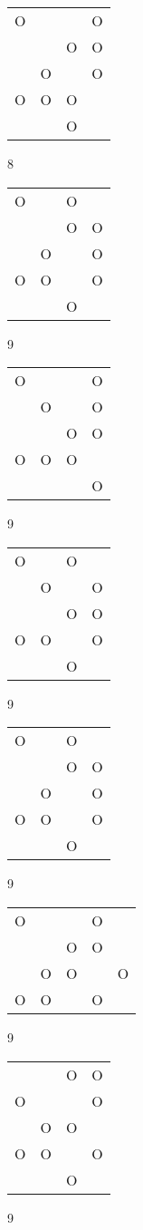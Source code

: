 \begin{tabular}{|m{0.2cm}m{0.2cm}m{0.2cm}m{0.2cm}|}\hline
O& & &O\\
 & &O&O\\
 &O& &O\\
O&O&O& \\
 & &O& \\
\hline\end{tabular}8
\begin{tabular}{|m{0.2cm}m{0.2cm}m{0.2cm}m{0.2cm}|}\hline
O& &O& \\
 & &O&O\\
 &O& &O\\
O&O& &O\\
 & &O& \\
\hline\end{tabular}9
\begin{tabular}{|m{0.2cm}m{0.2cm}m{0.2cm}m{0.2cm}|}\hline
O& & &O\\
 &O& &O\\
 & &O&O\\
O&O&O& \\
 & & &O\\
\hline\end{tabular}9
\begin{tabular}{|m{0.2cm}m{0.2cm}m{0.2cm}m{0.2cm}|}\hline
O& &O& \\
 &O& &O\\
 & &O&O\\
O&O& &O\\
 & &O& \\
\hline\end{tabular}9
\begin{tabular}{|m{0.2cm}m{0.2cm}m{0.2cm}m{0.2cm}|}\hline
O& &O& \\
 & &O&O\\
 &O& &O\\
O&O& &O\\
 & &O& \\
\hline\end{tabular}9
\begin{tabular}{|m{0.2cm}m{0.2cm}m{0.2cm}m{0.2cm}m{0.2cm}|}\hline
O& & &O& \\
 & &O&O& \\
 &O&O& &O\\
O&O& &O& \\
\hline\end{tabular}9
\begin{tabular}{|m{0.2cm}m{0.2cm}m{0.2cm}m{0.2cm}|}\hline
 & &O&O\\
O& & &O\\
 &O&O& \\
O&O& &O\\
 & &O& \\
\hline\end{tabular}9
